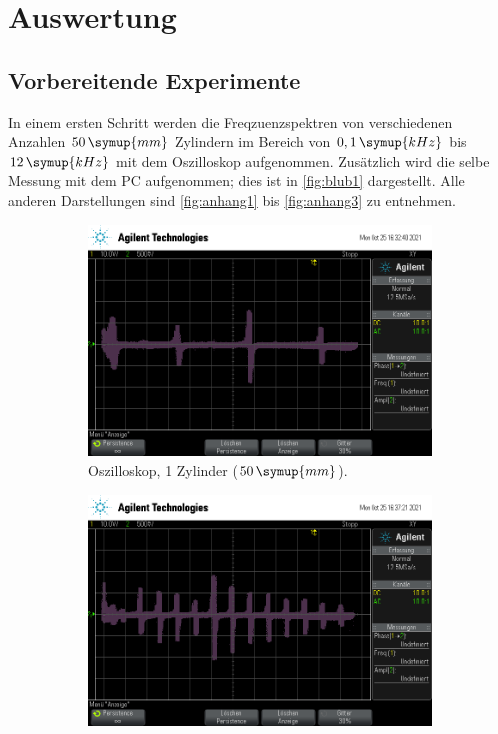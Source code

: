 \section{Auswertung}
\subsection{Vorbereitende Experimente}
In einem ersten Schritt werden die Freqzuenzspektren von verschiedenen Anzahlen $50 \,\symup{mm}$ Zylindern im Bereich 
von $0,1 \, \symup{kHz}$ bis $12 \, \symup{kHz}$ mit dem Oszilloskop aufgenommen. Zusätzlich wird die selbe
Messung mit dem PC aufgenommen; dies ist in \autoref{fig:blub1} dargestellt. Alle anderen Darstellungen sind
\autoref{fig:anhang1} bis \autoref{fig:anhang3} zu entnehmen.

\begin{figure}
    \centering
    \begin{subfigure}[b]{0.3\textwidth}
        \centering
        \includegraphics[width=\textwidth]{data/1_1zylinder50mm/scope_1.png}
        \caption{Oszilloskop, 1 Zylinder ($50 \, \symup{mm}$).}
    \end{subfigure}
    \hfill
    \begin{subfigure}[b]{0.3\textwidth}
        \centering
        \includegraphics[width=\textwidth]{data/1_1zylinder50mm/scope_4.png}

\end{subfigure}
\end{figure}
